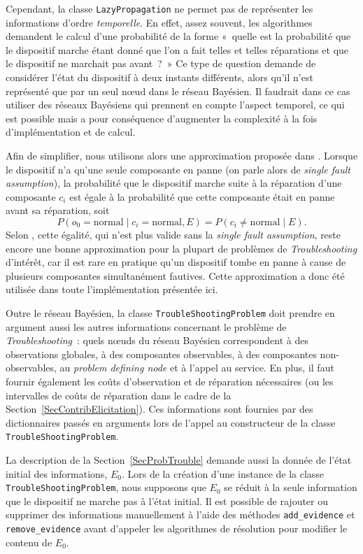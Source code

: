 \documentclass[a4paper,11pt]{article}
\theoremstyle{plain}
\theoremstyle{definition}
\begin{document}
Cependant, la classe \texttt{LazyPropagation} ne permet pas de représenter les informations d'ordre \emph{temporelle}. En effet, assez souvent, les algorithmes demandent le calcul d'une probabilité de la forme «~quelle est la probabilité que le dispositif marche étant donné que l'on a fait telles et telles réparations et que le dispositif ne marchait pas avant~?~» Ce type de question demande de considérer l'état du dispositif à deux instants différents, alors qu'il n'est représenté que par un seul nœud dans le réseau Bayésien. Il faudrait dans ce cas utiliser des réseaux Bayésiens qui prennent en compte l'aspect temporel, ce qui est possible mais a pour conséquence d'augmenter la complexité à la fois d'implémentation et de calcul.

Afin de simplifier, nous utilisons alors une approximation proposée dans \cite{Heckerman_1995, heckerman1994troubleshooting}. Lorsque le dispositif n'a qu'une seule composante en panne (on parle alors de \emph{single fault assumption}), la probabilité que le dispositif marche suite à la réparation d'une composante $c_i$ est égale à la probabilité que cette composante était en panne avant sa réparation, soit
\[
P(o_0 = \text{normal} \mid c_i = \text{normal}, E) = P(c_i \neq \text{normal} \mid E).
\]
Selon \cite{Heckerman_1995, heckerman1994troubleshooting}, cette égalité, qui n'est plus valide sans la \emph{single fault assumption}, reste encore une bonne approximation pour la plupart de problèmes de \emph{Troubleshooting} d'intérêt, car il est rare en pratique qu'un dispositif tombe en panne à cause de plusieurs composantes simultanément fautives. Cette approximation a donc été utilisée dans toute l'implémentation présentée ici.

Outre le réseau Bayésien, la classe \texttt{TroubleShootingProblem} doit prendre en argument aussi les autres informations concernant le problème de \emph{Troubleshooting}~: quels nœuds du réseau Bayésien correspondent à des observations globales, à des composantes observables, à des composantes non-observables, au \emph{problem defining node} et à l'appel au service. En plus, il faut fournir également les coûts d'observation et de réparation nécessaires (ou les intervalles de coûts de réparation dans le cadre de la Section~\ref{SecContribElicitation}). Ces informations sont fournies par des dictionnaires passés en arguments lors de l'appel au constructeur de la classe \texttt{TroubleShootingProblem}.

La description de la Section~\ref{SecProbTrouble} demande aussi la donnée de l'état initial des informations, $E_0$. Lors de la création d'une instance de la classe \texttt{TroubleShootingProblem}, nous supposons que $E_0$ se réduit à la seule information que le dispositif ne marche pas à l'état initial. Il est possible de rajouter ou supprimer des informations manuellement à l'aide des méthodes \texttt{add\_evidence} et \texttt{remove\_evidence} avant d'appeler les algorithmes de résolution pour modifier le contenu de $E_0$.
\end{document}
